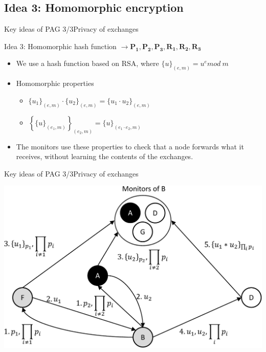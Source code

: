 \documentclass[10pt]{beamer}
\begin{document}
\subsection{Idea 3: Homomorphic encryption}
\begin{frame}{Key ideas of PAG 3/3}{Privacy of exchanges}
  \begin{block}{Idea 3: Homomorphic hash function $\longrightarrow \mathbf{P_1}, \mathbf{P_2}, \mathbf{P_3}, \mathbf{R_1}, \mathbf{R_2}, \mathbf{R_3} $}
  \begin{itemize}
  \item We use a hash function based on RSA, where $\{u\}_{(e,m)} = u^e mod\ m$
  \vspace{5mm}
  \item Homomorphic properties
  \begin{itemize}
  \item $\{u_1\}_{(e,m)} \cdot \{u_2\}_{(e,m)}  = \{u_1 \cdot u_2\}_{(e,m)}$ 
  \item $\left\{ \{u\}_{(e_1,m)} \right\}_{(e_2, m)} = \{u\}_{(e_1 \cdot e_2,m)}$
  \end{itemize}
  \vspace{5mm}
  \item The monitors use these properties to check that a node forwards what it receives, without learning the contents of the exchanges.
  \end{itemize}
  \end{block}
\end{frame}

\begin{frame}{Key ideas of PAG 3/3}{Privacy of exchanges}
\begin{center}
   \includegraphics[width=\textwidth]{fig/PAG/intuition}
\end{center}
\end{frame}
\end{document}

